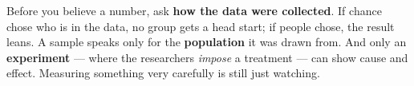 \documentclass[12pt]{article}
\begin{document}
\vspace{0.14in}

\boxguard[8]
\begin{remindbox}
\small
Before you believe a number, ask \textbf{how the data were collected}. If chance chose who is
in the data, no group gets a head start; if people chose, the result leans. A sample speaks only
for the \textbf{population} it was drawn from. And only an \textbf{experiment} --- where the
researchers \emph{impose} a treatment --- can show cause and effect. Measuring something very
carefully is still just watching.
\end{remindbox}
\end{document}
